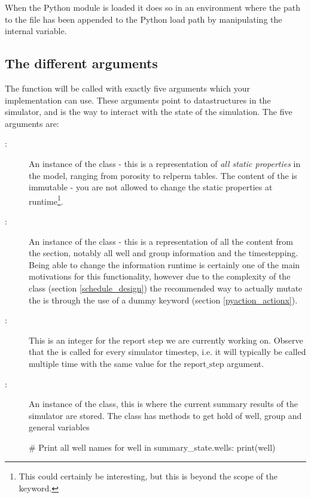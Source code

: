 When the Python module is loaded it does so in an environment where the path to
the  file has been appended to the Python load path by manipulating
the internal  variable.

 
\subsection{The different arguments}
The  function will be called with exactly five arguments which
your implementation can use. These arguments point to datastructures in the
simulator, and is the way to interact with the state of the simulation. The five
arguments are:
\begin{description}
\item[:] An instance of the 
  class - this is a representation of \emph{all static properties} in the model,
  ranging from porosity to relperm tables. The content of the
   is immutable - you are not allowed to change the static
  properties at runtime\footnote{This could certainly be interesting, but this
  is beyond the scope of the \pyaction{} keyword.}.
\item[:] An instance of the 
  class - this is a representation of all the content from the 
  section, notably all well and group information and the timestepping. Being
  able to change the  information runtime is certainly one of the
  main motivations for this functionality, however due to the complexity of
  the  class (section \ref{schedule_design})
  the recommended way to actually mutate the  is
  through the use of a dummy \actionx{} keyword (section
  \ref{pyaction_actionx}).
\item[:] This is an integer for the report step we
  are currently working on. Observe that the \pyaction{} is called for every
  simulator timestep, i.e. it will typically be called multiple time with
  the same value for the $\mathrm{report\_step}$ argument.
\item[:] An instance of the
   class, this is where the current summary
  results of the simulator are stored. The  class has
  methods to get hold of well, group and general variables
  \begin{code}
    # Print all well names
    for well in summary_state.wells:
        print(well)


\end{code}
\end{description}
